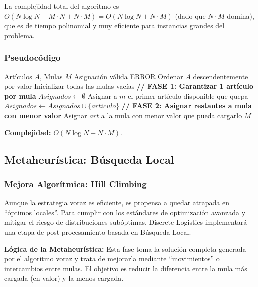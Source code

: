 \documentclass[12pt, a4paper]{article}
\begin{document}
    La complejidad total del algoritmo es $O(N \log N + M \cdot N + N \cdot M) = O(N \log N + N \cdot M)$ (dado que $N \cdot M$ domina), que es de tiempo polinomial y muy eficiente para instancias grandes del problema.

    \subsubsection{Pseudocódigo}
    \begin{algorithm}[H]
        \caption{Heurística Voraz (Greedy)}
        \begin{algorithmic}[1]
            \Require Artículos $A$, Mulas $M$
            \Ensure Asignación válida
                \State \Return ERROR
            \EndIf
            \State Ordenar $A$ descendentemente por valor
            \State Inicializar todas las mulas vacías
            \State
            \State \textbf{// FASE 1: Garantizar 1 artículo por mula}
            \State $Asignados \gets \emptyset$
                \State Asignar a $m$ el primer artículo disponible que quepa
                \State $Asignados \gets Asignados \cup \{articulo\}$
            \EndFor
            \State
            \State \textbf{// FASE 2: Asignar restantes a mula con menor valor}
                \State Asignar $art$ a la mula con menor valor que pueda cargarlo
            \EndFor
            \State \Return $M$
        \end{algorithmic}
    \end{algorithm}
    \textbf{Complejidad:} $O(N \log N + N \cdot M)$.

    \subsection{Metaheurística: Búsqueda Local}
    \subsubsection{Mejora Algorítmica: Hill Climbing}
    Aunque la estrategia voraz es eficiente, es propensa a quedar atrapada en ``óptimos locales''. Para cumplir con los estándares de optimización avanzada y mitigar el riesgo de distribuciones subóptimas, Discrete Logistics implementará una etapa de post-procesamiento basada en Búsqueda Local.

    \textbf{Lógica de la Metaheurística:} Esta fase toma la solución completa generada por el algoritmo voraz y trata de mejorarla mediante ``movimientos'' o intercambios entre mulas. El objetivo es reducir la diferencia entre la mula más cargada (en valor) y la menos cargada.
\end{document}
